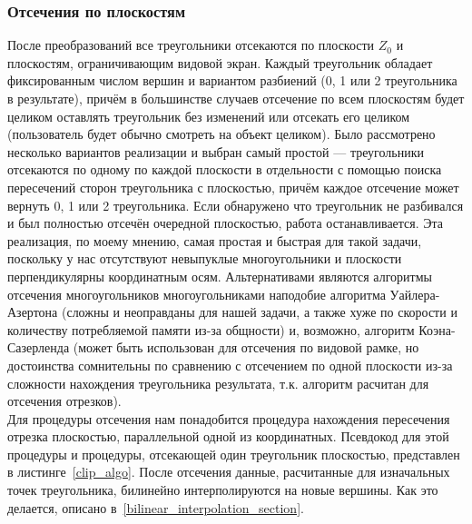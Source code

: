 \documentclass[a4paper,12pt]{report}
\numberwithin{equation}{section}
\begin{document}
\subsubsection{Отсечения по плоскостям}
После преобразований все треугольники отсекаются по плоскости $Z_0$ и плоскостям, ограничивающим видовой экран. Каждый треугольник обладает фиксированным числом вершин и вариантом разбиений (0, 1 или 2 треугольника в результате), причём в большинстве случаев отсечение по всем плоскостям будет целиком оставлять треугольник без изменений или отсекать его целиком (пользователь будет обычно смотреть на объект целиком). Было рассмотрено несколько вариантов реализации и выбран самый простой --- треугольники отсекаются по одному по каждой плоскости в отдельности с помощью поиска пересечений сторон треугольника с плоскостью, причём каждое отсечение может вернуть 0, 1 или 2 треугольника. Если обнаружено что треугольник не разбивался и был полностью отсечён очередной плоскостью, работа останавливается. Эта реализация, по моему мнению, самая простая и быстрая для такой задачи, поскольку у нас отсутствуют невыпуклые многоугольники и плоскости перпендикулярны координатным осям. Альтернативами являются алгоритмы отсечения многоугольников многоугольниками наподобие алгоритма Уайлера-Азертона (сложны и неоправданы для нашей задачи, а также хуже по скорости и количеству потребляемой памяти из-за общности) и, возможно, алгоритм Коэна-Сазерленда (может быть использован для отсечения по видовой рамке, но достоинства сомнительны по сравнению с отсечением по одной плоскости из-за сложности нахождения треугольника результата, т.к. алгоритм расчитан для отсечения отрезков). \\
Для процедуры отсечения нам понадобится процедура нахождения пересечения отрезка плоскостью, параллельной одной из координатных. Псевдокод для этой процедуры и процедуры, отсекающей один треугольник плоскостью, представлен в листинге~\ref{clip_algo}. После отсечения данные, расчитанные для изначальных точек треугольника, билинейно интерполируются на новые вершины. Как это делается, описано в~\ref{bilinear_interpolation_section}.
\end{document}
